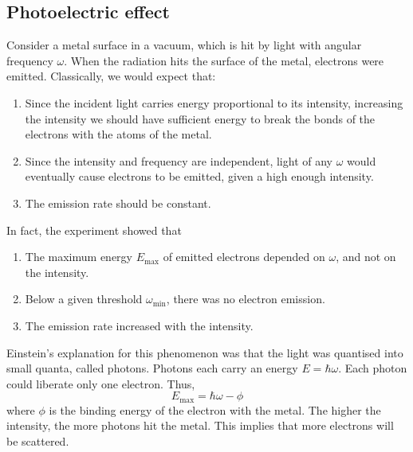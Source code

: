 \subsection{Photoelectric effect}
Consider a metal surface in a vacuum, which is hit by light with angular frequency \( \omega \).
When the radiation hits the surface of the metal, electrons were emitted.
Classically, we would expect that:
\begin{enumerate}
	\item Since the incident light carries energy proportional to its intensity, increasing the intensity we should have sufficient energy to break the bonds of the electrons with the atoms of the metal.
	\item Since the intensity and frequency are independent, light of any \( \omega \) would eventually cause electrons to be emitted, given a high enough intensity.
	\item The emission rate should be constant.
\end{enumerate}
In fact, the experiment showed that
\begin{enumerate}
	\item The maximum energy \( E_{\max} \) of emitted electrons depended on \( \omega \), and not on the intensity.
	\item Below a given threshold \( \omega_{\min} \), there was no electron emission.
	\item The emission rate increased with the intensity.
\end{enumerate}
Einstein's explanation for this phenomenon was that the light was quantised into small quanta, called photons.
Photons each carry an energy \( E = \hbar \omega \).
Each photon could liberate only one electron.
Thus,
\[
	E_{\max} = \hbar \omega - \phi
\]
where \( \phi \) is the binding energy of the electron with the metal.
The higher the intensity, the more photons hit the metal.
This implies that more electrons will be scattered.

